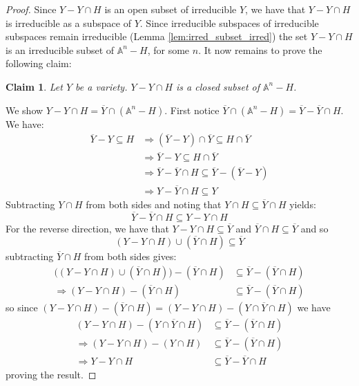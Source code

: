 \documentclass[12pt]{article}
\theoremstyle{plain}
\newtheorem{claim}[thm]{Claim}
\theoremstyle{definition}
\newcommand{\bb}[1]{\mathbb{#1}}
\begin{document}
\begin{proof}
Since $Y - Y \cap H$ is an open subset of irreducible $Y$, we have that $Y - Y \cap H$ is irreducible as a subspace of $Y$.  Since irreducible subspaces of irreducible subspaces remain irreducible (Lemma \ref{lem:irred_subset_irred}) the set $Y - Y \cap H$ is an irreducible subset of $\bb{A}^n - H$, for some $n$. It now remains to prove the following claim:
\begin{claim}
Let $Y$ be a variety. $Y - Y \cap H$ is a closed subset of $\bb{A}^n - H$.
\end{claim}
We show $Y - Y \cap H = \overline{Y} \cap (\bb{A}^n - H)$. First notice $\overline{Y} \cap (\bb{A}^n - H) = \overline{Y} - \overline{Y} \cap H$. We have:
\begin{align*}
    \overline{Y} - Y \subseteq H &\Longrightarrow (\overline{Y} - Y) \cap \overline{Y} \subseteq H \cap \overline{Y}\\
    &\Longrightarrow \overline{Y} - Y \subseteq H \cap \overline{Y}\\
    &\Longrightarrow \overline{Y} - \overline{Y} \cap H \subseteq \overline{Y} - (\overline{Y} - Y)\\
    &\Longrightarrow Y - \overline{Y} \cap H \subseteq Y
\end{align*}
Subtracting $Y \cap H$ from both sides and noting that $Y \cap H \subseteq \overline{Y} \cap H$ yields:
\begin{equation}
\label{eq:closed_sub}
\overline{Y} - \overline{Y} \cap H \subseteq Y - Y \cap H
\end{equation}
For the reverse direction, we have that $Y - Y \cap H \subseteq \overline{Y}$ and $\overline{Y} \cap H \subseteq \overline{Y}$ and so
\[(Y - Y \cap H) \cup (\overline{Y} \cap H) \subseteq \overline{Y}\]
subtracting $\overline{Y} \cap H$ from both sides gives:
\begin{align*}
    \big((Y - Y \cap H) \cup (\overline{Y} \cap H)\big) - (\overline{Y} \cap H) &\subseteq  \overline{Y} - (\overline{Y} \cap H)\\
    \Longrightarrow (Y - Y \cap H) - (\overline{Y} \cap H) &\subseteq \overline{Y} - (\overline{Y} \cap H)
\end{align*}
so since $(Y - Y \cap H) - (\overline{Y} \cap H) = (Y - Y \cap H) - (Y \cap \overline{Y} \cap H)$ we have
\begin{align*}
    (Y - Y \cap H) - (Y \cap \overline{Y} \cap H) &\subseteq \overline{Y}  - (\overline{Y} \cap H)\\
    \Longrightarrow (Y - Y \cap H) - (Y \cap H) &\subseteq \overline{Y}  - (\overline{Y} \cap H)\\
    \Longrightarrow Y - Y \cap H &\subseteq \overline{Y}  - \overline{Y} \cap H
\end{align*}
proving the result.
\end{proof}
\end{document}
